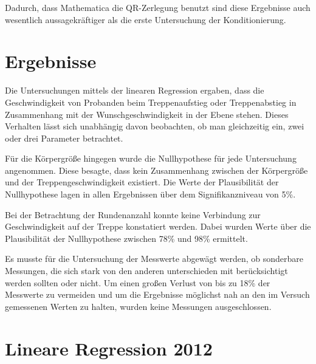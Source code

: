 Dadurch, dass Mathematica die QR-Zerlegung benutzt sind diese Ergebnisse auch wesentlich aussagekräftiger als die erste Untersuchung der Konditionierung.

\section{Ergebnisse}

Die Untersuchungen mittels der linearen Regression ergaben, dass die Geschwindigkeit von Probanden beim Treppenaufstieg oder Treppenabstieg in Zusammenhang mit der Wunschgeschwindigkeit in der Ebene stehen. Dieses Verhalten lässt sich unabhängig davon beobachten, ob man gleichzeitig ein, zwei oder drei Parameter betrachtet.

Für die Körpergröße hingegen wurde die Nullhypothese für jede Untersuchung angenommen. Diese besagte, dass kein Zusammenhang zwischen der Körpergröße und der Treppengeschwindigkeit existiert. Die Werte der Plausibilität der Nullhypothese lagen in allen Ergebnissen über dem Signifikanzniveau von 5\%.

Bei der Betrachtung der Rundenanzahl konnte keine Verbindung zur Geschwindigkeit auf der Treppe konstatiert werden. Dabei wurden Werte über die Plausibilität der Nullhypothese zwischen 78\% und 98\% ermittelt.

Es musste für die Untersuchung der Messwerte abgewägt werden, ob sonderbare Messungen, die sich stark von den anderen unterschieden mit berücksichtigt werden sollten oder nicht. Um einen großen Verlust von bis zu 18\% der Messwerte zu vermeiden und um die Ergebnisse möglichst nah an den im Versuch gemessenen Werten zu halten, wurden keine Messungen ausgeschlossen.

\section{Lineare Regression 2012}


